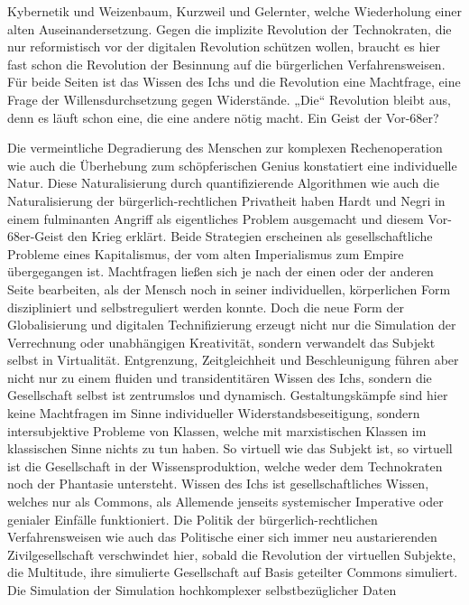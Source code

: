 \documentclass[a4paper,11pt]{article}
\begin{document}
Kybernetik und Weizenbaum, Kurzweil und Gelernter, welche Wiederholung einer
alten Auseinandersetzung. Gegen die implizite Revolution der Technokraten,
die nur reformistisch vor der digitalen Revolution schützen wollen, braucht es
hier fast schon die Revolution der Besinnung auf die bürgerlichen
Verfahrensweisen. Für beide Seiten ist das Wissen des Ichs und die Revolution
eine Machtfrage, eine Frage der Willensdurchsetzung gegen Widerstände. „Die“
Revolution bleibt aus, denn es läuft schon eine, die eine andere nötig
macht. Ein Geist der Vor-68er?

Die vermeintliche Degradierung des Menschen zur komplexen Rechenoperation wie
auch die Überhebung zum schöpferischen Genius konstatiert eine individuelle
Natur. Diese Naturalisierung durch quantifizierende Algorithmen wie auch die
Naturalisierung der bürgerlich-rechtlichen Privatheit haben Hardt und Negri in
einem fulminanten Angriff als eigentliches Problem ausgemacht und diesem
Vor-68er-Geist den Krieg erklärt. Beide Strategien erscheinen als
gesellschaftliche Probleme eines Kapitalismus, der vom alten Imperialismus zum
Empire übergegangen ist. Machtfragen ließen sich je nach der einen oder der
anderen Seite bearbeiten, als der Mensch noch in seiner individuellen,
körperlichen Form diszipliniert und selbstreguliert werden konnte. Doch die
neue Form der Globalisierung und digitalen Technifizierung erzeugt nicht nur
die Simulation der Verrechnung oder unabhängigen Kreativität, sondern
verwandelt das Subjekt selbst in Virtualität. Entgrenzung, Zeitgleichheit und
Beschleunigung führen aber nicht nur zu einem fluiden und transidentitären
Wissen des Ichs, sondern die Gesellschaft selbst ist zentrumslos und
dynamisch. Gestaltungskämpfe sind hier keine Machtfragen im Sinne
individueller Widerstandsbeseitigung, sondern intersubjektive Probleme von
Klassen, welche mit marxistischen Klassen im klassischen Sinne nichts zu tun
haben. So virtuell wie das Subjekt ist, so virtuell ist die Gesellschaft in
der Wissensproduktion, welche weder dem Technokraten noch der Phantasie
untersteht. Wissen des Ichs ist gesellschaftliches Wissen, welches nur als
Commons, als Allemende jenseits systemischer Imperative oder genialer Einfälle
funktioniert. Die Politik der bürgerlich-rechtlichen Verfahrensweisen wie auch
das Politische einer sich immer neu austarierenden Zivilgesellschaft
verschwindet hier, sobald die Revolution der virtuellen Subjekte, die
Multitude, ihre simulierte Gesellschaft auf Basis geteilter Commons
simuliert. Die Simulation der Simulation hochkomplexer selbstbezüglicher Daten
\end{document}
